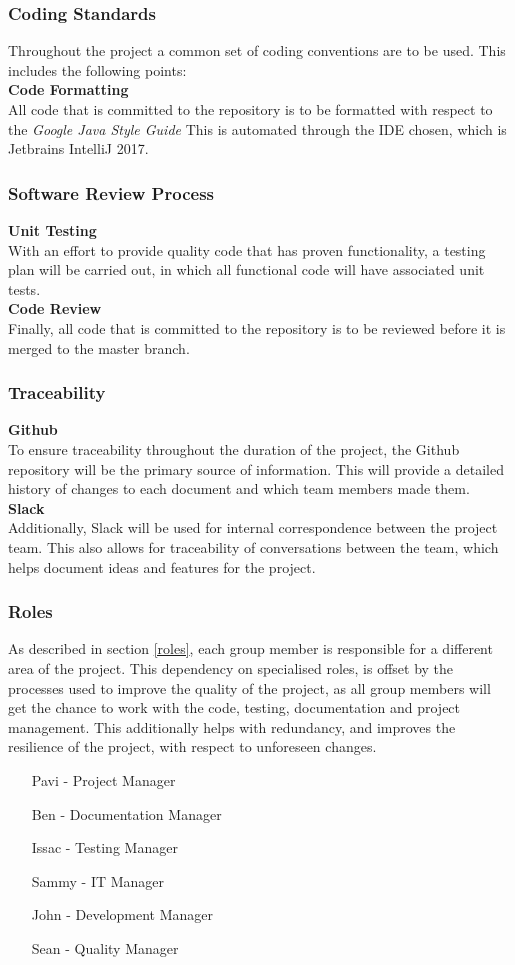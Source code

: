 \subsubsection{Coding Standards}
Throughout the project a common set of coding conventions are to be used. This includes the following points:\\

\textbf{Code Formatting}\\
All code that is committed to the repository is to be formatted with respect to the \textit{Google Java Style Guide} This is automated through the IDE chosen, which is Jetbrains IntelliJ 2017.\\

\subsubsection{Software Review Process}
\textbf{Unit Testing}\\
With an effort to provide quality code that has proven functionality, a testing plan will be carried out, in which all functional code will have associated unit tests.\\

\textbf{Code Review}\\
Finally, all code that is committed to the repository is to be reviewed before it is merged to the master branch.

\subsubsection{Traceability}
\textbf{Github}\\
To ensure traceability throughout the duration of the project, the Github repository will be the primary source of information. This will provide a detailed history of changes to each document and which team members made them. \\

\textbf{Slack}\\
Additionally, Slack will be used for internal correspondence between the project team. This also allows for traceability of conversations between the team, which helps document ideas and features for the project.

\subsubsection{Roles}
As described in section \ref{roles}, each group member is responsible for a different area of the project. This dependency on specialised roles, is offset by the processes used to improve the quality of the project, as all group members will get the chance to work with the code, testing, documentation and project management. This additionally helps with redundancy, and improves the resilience of the project, with respect to unforeseen changes.

\begin{enumerate}
	\item[Pavi] - Project Manager
	\item[Ben] - Documentation Manager
	\item[Issac] - Testing Manager
	\item[Sammy] - IT Manager
	\item[John] - Development Manager
	\item[Sean] - Quality Manager
\end{enumerate}
